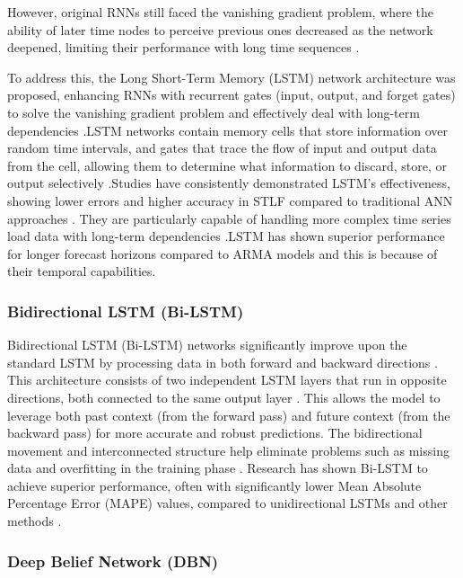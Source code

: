  However, original RNNs still faced the vanishing gradient problem, where the ability of later time nodes to perceive previous ones decreased as the network deepened, limiting their performance with long time sequences \cite{wang2018short}.
 
 To address this, the Long Short-Term Memory (LSTM) network architecture was proposed, enhancing RNNs with recurrent gates (input, output, and forget gates) to solve the vanishing gradient problem and effectively deal with long-term dependencies \cite{wang2023short}.LSTM networks contain memory cells that store information over random time intervals, and gates that trace the flow of input and output data from the cell, allowing them to determine what information to discard, store, or output selectively \cite{he2019hybrid}.Studies have consistently demonstrated LSTM's effectiveness, showing lower errors and higher accuracy in STLF compared to traditional ANN approaches \cite{ahmed2020review}\cite{boopathy2024deep}. They are particularly capable of handling more complex time series load data with long-term dependencies \cite{rafi2021short}.LSTM has shown superior performance for longer forecast horizons compared to ARMA models \cite{tshipata2024multi} and this is because of their temporal capabilities.
 
 \subsubsection{Bidirectional LSTM (Bi-LSTM)}

 Bidirectional LSTM (Bi-LSTM) networks significantly improve upon the standard LSTM by processing data in both forward and backward directions \cite{wang2023short}. This architecture consists of two independent LSTM layers that run in opposite directions, both connected to the same output layer \cite{moradzadeh2021deep}. This allows the model to leverage both past context (from the forward pass) and future context (from the backward pass) for more accurate and robust predictions. The bidirectional movement and interconnected structure help eliminate problems such as missing data and overfitting in the training phase \cite{moradzadeh2021deep}. Research has shown Bi-LSTM to achieve superior performance, often with significantly lower Mean Absolute Percentage Error (MAPE) values, compared to unidirectional LSTMs and other methods \cite{ibrahim2022machine}.
 
 \subsubsection{Deep Belief Network (DBN)}\label{lit:dbn}

